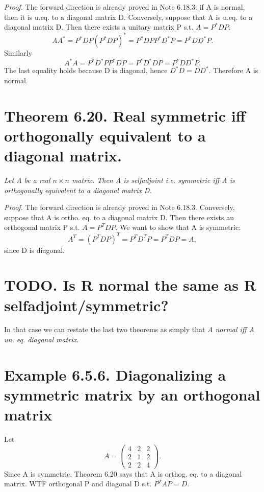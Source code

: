 \documentclass[12pt,english]{article}
\begin{document}
\emph{Proof. }The forward direction is already proved in Note 6.18.3:
if A is normal, then it is u.eq. to a diagonal matrix D. Conversely,
suppose that A is u.eq. to a diagonal matrix D. Then there exists
a unitary matrix P s.t. $A=P^{*}DP.$
\[
AA^{*}=P^{*}DP(P^{*}DP)^{*}=P^{*}DPP^{*}D^{*}P=P^{*}DD^{*}P.
\]
Similarly
\[
A^{*}A=P^{*}D^{*}PP^{*}DP=P^{*}D^{*}DP=P^{*}DD^{*}P.
\]
The last equality holds because D is diagonal, hence $D^{*}D=DD^{*}.$
Therefore A is normal.

\section{Theorem 6.20. Real symmetric iff orthogonally equivalent to a diagonal
matrix.}

\emph{Let A be a real $n\times n$ matrix. Then A is selfadjoint i.e.
symmetric iff A is orthogonally equivalent to a diagonal matrix D.}

\emph{Proof. }The forward direction is already proved in Note 6.18.3.
Conversely, suppose that A is ortho. eq. to a diagonal matrix D. Then
there exists an orthogonal matrix P s.t. $A=P^{T}DP.$ We want to
show that A is symmetric:
\[
A^{T}=(P^{T}DP)^{T}=P^{T}D^{T}P=P^{T}DP=A,
\]
since D is diagonal.

\section{TODO. Is R normal the same as R selfadjoint/symmetric?}

In that case we can restate the last two theorems as simply that \emph{A
normal iff A un. eq. diagonal matrix.}

\section{Example 6.5.6. Diagonalizing a symmetric matrix by an orthogonal
matrix}

Let
\[
A=\left(\begin{array}{ccc}
{4} & {2} & {2}\\
{2} & {1} & {2}\\
{2} & {2} & {4}
\end{array}\right).
\]
Since A is symmetric, Theorem 6.20 says that A is orthog. eq. to a
diagonal matrix. WTF orthogonal P and diagonal D s.t. $P^{T}AP=D.$
\end{document}
